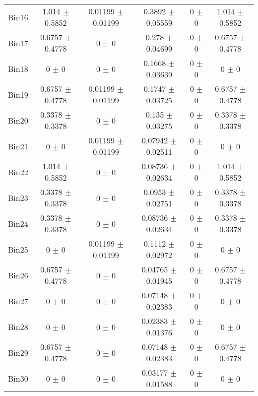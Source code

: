\begin{tabular}{@{\extracolsep{4pt}}lccccc@{}}
     Bin16 & 1.014 $\pm$ 0.5852 & 0.01199 $\pm$ 0.01199 & 0.3892 $\pm$ 0.05559 & 0 $\pm$ 0 & 1.014 $\pm$ 0.5852 \\ 
     Bin17 & 0.6757 $\pm$ 0.4778 & 0 $\pm$ 0 & 0.278 $\pm$ 0.04699 & 0 $\pm$ 0 & 0.6757 $\pm$ 0.4778 \\ 
     Bin18 & 0 $\pm$ 0 & 0 $\pm$ 0 & 0.1668 $\pm$ 0.03639 & 0 $\pm$ 0 & 0 $\pm$ 0 \\ 
     Bin19 & 0.6757 $\pm$ 0.4778 & 0.01199 $\pm$ 0.01199 & 0.1747 $\pm$ 0.03725 & 0 $\pm$ 0 & 0.6757 $\pm$ 0.4778 \\ 
     Bin20 & 0.3378 $\pm$ 0.3378 & 0 $\pm$ 0 & 0.135 $\pm$ 0.03275 & 0 $\pm$ 0 & 0.3378 $\pm$ 0.3378 \\ 
     Bin21 & 0 $\pm$ 0 & 0.01199 $\pm$ 0.01199 & 0.07942 $\pm$ 0.02511 & 0 $\pm$ 0 & 0 $\pm$ 0 \\ 
     Bin22 & 1.014 $\pm$ 0.5852 & 0 $\pm$ 0 & 0.08736 $\pm$ 0.02634 & 0 $\pm$ 0 & 1.014 $\pm$ 0.5852 \\ 
     Bin23 & 0.3378 $\pm$ 0.3378 & 0 $\pm$ 0 & 0.0953 $\pm$ 0.02751 & 0 $\pm$ 0 & 0.3378 $\pm$ 0.3378 \\ 
     Bin24 & 0.3378 $\pm$ 0.3378 & 0 $\pm$ 0 & 0.08736 $\pm$ 0.02634 & 0 $\pm$ 0 & 0.3378 $\pm$ 0.3378 \\ 
     Bin25 & 0 $\pm$ 0 & 0.01199 $\pm$ 0.01199 & 0.1112 $\pm$ 0.02972 & 0 $\pm$ 0 & 0 $\pm$ 0 \\ 
     Bin26 & 0.6757 $\pm$ 0.4778 & 0 $\pm$ 0 & 0.04765 $\pm$ 0.01945 & 0 $\pm$ 0 & 0.6757 $\pm$ 0.4778 \\ 
     Bin27 & 0 $\pm$ 0 & 0 $\pm$ 0 & 0.07148 $\pm$ 0.02383 & 0 $\pm$ 0 & 0 $\pm$ 0 \\ 
     Bin28 & 0 $\pm$ 0 & 0 $\pm$ 0 & 0.02383 $\pm$ 0.01376 & 0 $\pm$ 0 & 0 $\pm$ 0 \\ 
     Bin29 & 0.6757 $\pm$ 0.4778 & 0 $\pm$ 0 & 0.07148 $\pm$ 0.02383 & 0 $\pm$ 0 & 0.6757 $\pm$ 0.4778 \\ 
     Bin30 & 0 $\pm$ 0 & 0 $\pm$ 0 & 0.03177 $\pm$ 0.01588 & 0 $\pm$ 0 & 0 $\pm$ 0 \\ 
\hline\hline
  \end{tabular}
